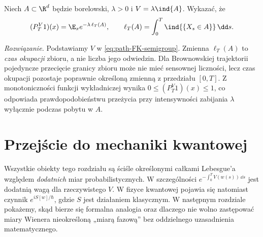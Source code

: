 \begin{zadanie}
Niech $A\subset\R^d$ będzie borelowski,
$\lambda>0$ i $V=\lambda\ind{A}$. Wykazać, że
\[
 (P_T^V1)(x)=\E_x e^{-\lambda\,\ell_T(A)},
 \qquad \ell_T(A)=\int_0^T\ind{\{X_s\in A\}}\,\dd s.
\]

\emph{Rozwiązanie.} Podstawiamy $V$ w
\eqref{eq:path-FK-semigroup}. Zmienna $\ell_T(A)$
to \emph{czas okupacji} zbioru, a nie liczba jego odwiedzin.
Dla Brownowskiej trajektorii pojedyncze przecięcie granicy
zbioru może nie mieć sensownej liczności, lecz czas
okupacji pozostaje poprawnie określoną zmienną z przedziału
$[0,T]$. Z monotoniczności funkcji wykładniczej wynika
$0\le (P_T^V1)(x)\le1$, co odpowiada prawdopodobieństwu
przeżycia przy intensywności zabijania $\lambda$ wyłącznie
podczas pobytu w $A$.
\end{zadanie}

\section{Przejście do mechaniki kwantowej}

Wszystkie obiekty tego rozdziału są ściśle określonymi
całkami Lebesgue'a względem \emph{dodatnich} miar
probabilistycznych. W szczególności
$e^{-\int_0^T V(w(s))\,\dd s}$ jest dodatnią wagą dla
rzeczywistego $V$. W fizyce kwantowej pojawia się natomiast
czynnik $e^{iS[w]/\hbar}$, gdzie $S$ jest działaniem
klasycznym. W następnym rozdziale pokażemy, skąd bierze się
formalna analogia oraz dlaczego nie wolno zastępować
miary Wienera nieokreśloną „miarą fazową” bez oddzielnego
uzasadnienia matematycznego.


